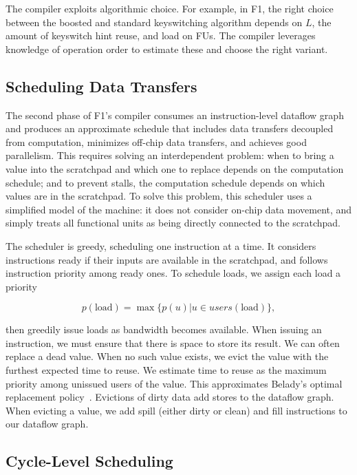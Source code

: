 The compiler exploits algorithmic choice. For example, in F1, the right choice
between the boosted and standard keyswitching algorithm depends on $L$, the
amount of keyswitch hint reuse, and load on FUs. The compiler leverages
knowledge of operation order to estimate these and choose the right variant.

\subsection{Scheduling Data Transfers}
\label{sec:datatransfers}

The second phase of F1's compiler consumes an instruction-level dataflow graph
and produces an approximate schedule that includes data transfers decoupled
from computation, minimizes off-chip data transfers, and achieves good
parallelism. This requires solving an interdependent problem: when to bring a
value into the scratchpad and which one to replace depends on the computation
schedule; and to prevent stalls, the computation schedule depends on which
values are in the scratchpad. To solve this problem, this scheduler uses a
simplified model of the machine: it does not consider on-chip data movement,
and simply treats all functional units as being directly connected to the
scratchpad.

The scheduler is greedy, scheduling one instruction at a time. It considers
instructions ready if their inputs are available in the scratchpad, and follows
instruction priority among ready ones. To schedule loads, we assign each load a
priority

\begin{equation*}
p(\text{load}) = \max \{ p(u) | u \in users(\text{load})\},
\end{equation*}

then greedily issue loads as bandwidth becomes available. When issuing an
instruction, we must ensure that there is space to store its result. We can
often replace a dead value. When no such value exists, we evict the value with
the furthest expected time to reuse. We estimate time to reuse as the maximum
priority among unissued users of the value. This approximates Belady's optimal
replacement policy~\cite{belady1966study}. Evictions of dirty data add stores
to the dataflow graph. When evicting a value, we add spill (either dirty or
clean) and fill instructions to our dataflow graph.

\subsection{Cycle-Level Scheduling}

